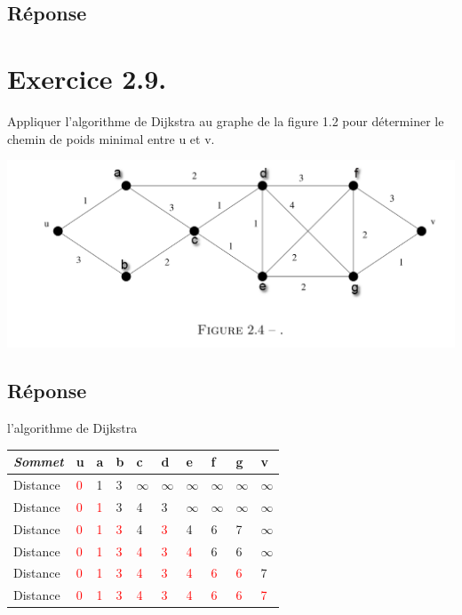 \documentclass[12pt]{fphw}
\begin{document}
\subsection*{Réponse}

\section*{Exercice 2.9.}
\begin{problem}
Appliquer l’algorithme de Dijkstra au graphe de la figure 1.2 pour
déterminer le chemin de poids minimal entre u et v.
\end{problem}
\begin{center}
	\includegraphics[width=1\columnwidth]{Figure2.4.png} %
\end{center}
\subsection*{Réponse}
\begin{center}
l’algorithme de Dijkstra\\
	\begin{tabular}{l l l l l l l l l l}
		\toprule
		\textit{Sommet} & u & a & b & c & d &e & f & g & v\\
		\midrule
		Distance &  \textcolor{red}{0} & 1 &3 & $\infty$ & $\infty$  & $\infty$  & $\infty$  & $\infty$  & $\infty$  \\
		Distance &  \textcolor{red}{0} & \textcolor{red}{1} &3 & 4 & 3  & $\infty$  & $\infty$  & $\infty$  & $\infty$  \\
		Distance &  \textcolor{red}{0} & \textcolor{red}{1} &\textcolor{red}{3} & 4 & \textcolor{red}{3}  & 4  & 6  & 7  & $\infty$  \\
		Distance &  \textcolor{red}{0} & \textcolor{red}{1} &\textcolor{red}{3} & \textcolor{red}{4} & \textcolor{red}{3}  & \textcolor{red}{4}  & 6  & 6  & $\infty$  \\
		Distance &  \textcolor{red}{0} & \textcolor{red}{1} &\textcolor{red}{3} & \textcolor{red}{4} & \textcolor{red}{3}  & \textcolor{red}{4}  & \textcolor{red}{6}  & \textcolor{red}{6}  & 7  \\
		Distance &  \textcolor{red}{0} & \textcolor{red}{1} &\textcolor{red}{3} & \textcolor{red}{4} & \textcolor{red}{3}  & \textcolor{red}{4}  & \textcolor{red}{6}  & \textcolor{red}{6}  & \textcolor{red}{7}  \\
		\bottomrule
	\end{tabular}
\end{center}
\end{document}
